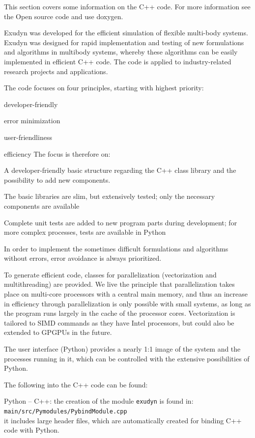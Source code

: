 This section covers some information on the C++ code. For more information see the Open source code and use doxygen.

Exudyn was developed for the efficient simulation of flexible multi-body systems. Exudyn was designed for rapid implementation and testing of new formulations and algorithms in multibody systems, whereby these algorithms can be easily implemented in efficient C++ code. The code is applied to industry-related research projects and applications.

The code focuses on four principles, starting with highest priority: 
\bn
  \item developer-friendly
  \item error minimization
  \item user-friendliness
  \item efficiency
\en
The focus is therefore on:
\bi
    \item A developer-friendly basic structure regarding the C++ class library and the possibility to add new components.
    \item The basic libraries are slim, but extensively tested; only the necessary components are available
    \item Complete unit tests are added to new program parts during development; for more complex processes, tests are available in Python
    \item In order to implement the sometimes difficult formulations and algorithms without errors, error avoidance is always prioritized.
    \item To generate efficient code, classes for parallelization (vectorization and multithreading) are provided. We live the principle that parallelization takes place on multi-core processors with a central main memory, and thus an increase in efficiency through parallelization is only possible with small systems, as long as the program runs largely in the cache of the processor cores. Vectorization is tailored to SIMD commands as they have Intel processors, but could also be extended to GPGPUs in the future.
    \item The user interface (Python) provides a nearly 1:1 image of the system and the processes running in it, which can be controlled with the extensive possibilities of Python.
\ei

%
The following  into the C++ code can be found:
\bi
  \item Python -- C++: the creation of the module \texttt{exudyn} is found in:\\
    \texttt{main/src/Pymodules/PybindModule.cpp}\\
  it includes large header files, which are automatically created for binding C++ code with Python.%
  
